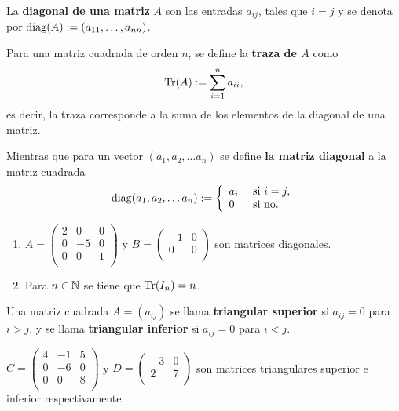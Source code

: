 \begin{defin}
La \textbf{diagonal de una matriz} $A$ son las entradas $a_{i j}$, tales que $i=j$ y se denota por $\operatorname{diag}(A):=(a_{11}, \dots, a_{nn})$.

Para una matriz cuadrada de orden $n$, se define la \textbf{traza de $A$} como
\[\operatorname{Tr}(A):=\sum_{i=1}^{n} a_{ii},\]
es decir, la traza corresponde a la suma de los elementos de la diagonal de una matriz.

Mientras que para un vector $(a_{1} ,a_{2} ,  \dots  a_{n})$ se define \textbf{la matriz diagonal} a la matriz cuadrada
\[\operatorname{diag}(a_{1} ,a_{2} ,  \dots  a_{n}):=\left\{\begin{array}{ll}
    a_i & \text{ si } i=j,\\
    0 & \text{ si no.}
\end{array}\right.\]
\end{defin}



\begin{ejem}
\begin{enumerate}
    \item     $A=\begin{pmatrix}
    2 & 0 & 0\\
    0 & -5 & 0\\
    0 & 0 & 1\\
    \end{pmatrix}
    $ y $B=\begin{pmatrix}
    -1 & 0 \\
    0 & 0 \\
    \end{pmatrix}$ son matrices diagonales.
    \item Para $n\in \mathbb{N}$ se tiene que $\operatorname{Tr}(I_n)=n$.
\end{enumerate}

\end{ejem}


\begin{defin}
Una matriz cuadrada $A = (a_{i j})$ se llama \textbf{triangular
superior} si $a_{i j} = 0$ para $i > j$, y se llama \textbf{triangular inferior}
si $a_{i j} = 0$ para $i < j$.

\end{defin}


\begin{ejem}
    $C=\begin{pmatrix}
    4 & -1 & 5\\
    0 & -6 & 0\\
    0 & 0 & 8\\
    \end{pmatrix}
    $ y $D=\begin{pmatrix}
    -3 & 0 \\
    2 & 7 \\
    \end{pmatrix}$ son matrices triangulares superior e inferior respectivamente.
\end{ejem}

